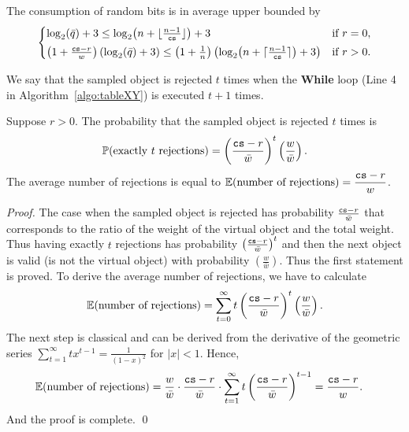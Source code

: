 \begin{proposition}
\label{prop:bits_consumption}
    The consumption of random bits is in average upper bounded by
    \[
        \begin{cases}
            \log_2(\bar{q}) + 3 \leq \log_2\!\big(n + \lfloor \frac{n-1}{\texttt{cs}} \rfloor\big) + 3 & \text{if } r = 0,\\[1mm]
            \left(1+\frac{\texttt{cs} - r}{w}\right) \left(\log_2(\bar{q}) + 3\right) \leq \left(1+\frac{1}{n}\right) \left(\log_2\!\big(n + \lceil \frac{n-1}{\texttt{cs}} \rceil\big) + 3\right) & \text{if } r > 0.
        \end{cases}
    \]
\end{proposition}

We say that the sampled object is rejected $t$ times when the \textbf{While} loop 
(Line 4 in Algorithm~\ref{algo:tableXY}) is executed $t+1$ times.
\begin{lemma}
\label{lem:bits_consumption}
    Suppose $r > 0$. The probability that the sampled object is rejected $t$ times is
    \[
        \mathbb{P}(\text{exactly }t \text{ rejections}) = \left( \frac{\texttt{cs} - r}{\bar{w}} \right)^t \left( \frac{w}{\bar{w}} \right).
    \]
    The average number of rejections is equal to $\displaystyle{\mathbb{E}(\text{number of rejections}) = \frac{\texttt{cs}- r}{w}}$.
\end{lemma}
\begin{proof}
    The case when the sampled object is rejected has probability $\frac{\texttt{cs} - r}{\bar{w}}$ that corresponds
    to the ratio of the weight of the virtual object and the total weight. 
    Thus having exactly $t$ rejections has probability $\left( \frac{\texttt{cs} - r}{\bar{w}} \right)^t$
    and then the next object is valid (is not the virtual object) with probability $\left( \frac{w}{\bar{w}} \right)$.
    Thus the first statement is proved.
    To derive the average number of rejections, we have to calculate 
    \[
        \mathbb{E}(\text{number of rejections}) = \sum_{t=0}^{\infty} t \left( \frac{\texttt{cs} - r}{\bar{w}} \right)^t \left( \frac{w}{\bar{w}} \right).  
    \]
    The next step is classical and can be derived from the derivative of the geometric series 
    $\sum_{t=1}^{\infty} t x^{t-1} = \frac{1}{(1-x)^2}$ for $|x|<1$.
    Hence,
    \begin{align*}
        \mathbb{E}(\text{number of rejections}) &= \frac{w}{\bar{w}} \cdot \frac{\texttt{cs} - r}{\bar{w}} \cdot \sum_{t=1}^{\infty} t \left( \frac{\texttt{cs} - r}{\bar{w}} \right)^{t-1} 
        = \frac{\texttt{cs} - r}{w}.
    \end{align*}
    And the proof is complete. \qed
\end{proof}


